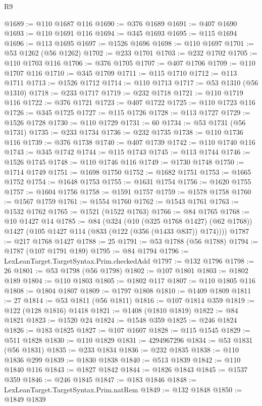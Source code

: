 \begin{lexlean}{R9}
\begin{coremodule}
@1689 := @110 @1687 @116
@1690 := @376 @1689
@1691 := @407 @1690
@1693 := @110 @1691 @116
@1694 := @345 @1693
@1695 := @115 @1694
@1696 := @113 @1695
@1697 := @1526 @1696
@1698 := @110 @1697
@1701 := @53 @1262 (@56 @1262)
@1702 := @233 @1701
@1703 := @232 @1702
@1705 := @110 @1703 @116
@1706 := @376 @1705
@1707 := @407 @1706
@1709 := @110 @1707 @116
@1710 := @345 @1709
@1711 := @115 @1710
@1712 := @113 @1711
@1713 := @1526 @1712
@1714 := @110 @1713
@1717 := @53 @1310 (@56 @1310)
@1718 := @233 @1717
@1719 := @232 @1718
@1721 := @110 @1719 @116
@1722 := @376 @1721
@1723 := @407 @1722
@1725 := @110 @1723 @116
@1726 := @345 @1725
@1727 := @115 @1726
@1728 := @113 @1727
@1729 := @1526 @1728
@1730 := @110 @1729
@1731 := 60
@1734 := @53 @1731 (@56 @1731)
@1735 := @233 @1734
@1736 := @232 @1735
@1738 := @110 @1736 @116
@1739 := @376 @1738
@1740 := @407 @1739
@1742 := @110 @1740 @116
@1743 := @345 @1742
@1744 := @115 @1743
@1745 := @113 @1744
@1746 := @1526 @1745
@1748 := @110 @1746 @116
@1749 := @1730 @1748
@1750 := @1714 @1749
@1751 := @1698 @1750
@1752 := @1682 @1751
@1753 := @1665 @1752
@1754 := @1648 @1753
@1755 := @1631 @1754
@1756 := @1620 @1755
@1757 := @1604 @1756
@1758 := @1591 @1757
@1759 := @1578 @1758
@1760 := @1567 @1759
@1761 := @1554 @1760
@1762 := @1543 @1761
@1763 := @1532 @1762
@1765 := @1521 (@1522 @1763)
@1766 := @84 @1765
@1768 := @10 @1427 @14
@1785 := @84
    (@324
      (@10 (@325 @1768 @1427) (@62 @1768))
      @1427
      (@105 @1427 @114 (@833 (@122 (@356 (@1433 @837)) @174))))
@1787 := @217 @1768 @1427
@1788 := 25
@1791 := @53 @1788 (@56 @1788)
@1794 := @1787 (@107 @1791 @189)
@1795 := @84 @1794
@1796 := LexLeanTarget.TargetSyntax.Prim.checkedAdd
@1797 := @132 @1796
@1798 := 26
@1801 := @53 @1798 (@56 @1798)
@1802 := @107 @1801
@1803 := @1802 @189
@1804 := @110 @1803
@1805 := @1802 @117
@1807 := @110 @1805 @116
@1808 := @1804 @1807
@1809 := @1797 @1808
@1810 := @1409 @1809
@1811 := 27
@1814 := @53 @1811 (@56 @1811)
@1816 := @107 @1814 @359
@1819 := @122 (@128 @1816) @1418
@1821 := @1408 (@1810 @1819)
@1822 := @84 @1821
@1823 := @1520 @24
@1824 := @1548 @359
@1825 := @246 @1824
@1826 := @183 @1825
@1827 := @107 @1607
@1828 := @115 @1545
@1829 := @511 @1828
@1830 := @110 @1829
@1831 := 4294967296
@1834 := @53 @1831 (@56 @1831)
@1835 := @233 @1834
@1836 := @232 @1835
@1838 := @110 @1836 @299
@1839 := @1830 @1838
@1840 := @513 @1839
@1842 := @110 @1840 @116
@1843 := @1827 @1842
@1844 := @1826 @1843
@1845 := @1537 @359
@1846 := @246 @1845
@1847 := @183 @1846
@1848 := LexLeanTarget.TargetSyntax.Prim.natRem
@1849 := @132 @1848
@1850 := @1849 @1839

\end{coremodule}
\end{lexlean}
